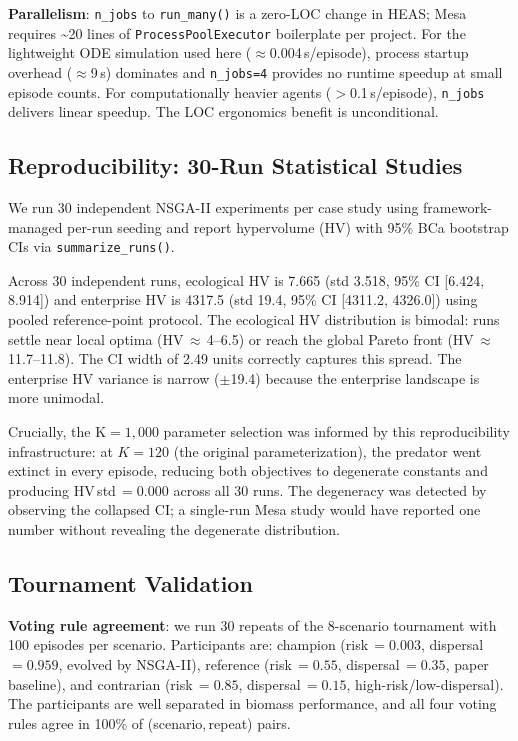 \documentclass{wscpaperproc}
\begin{document}
\textbf{Parallelism}: \texttt{n\_jobs} to \texttt{run\_many()} is a zero-LOC
change in HEAS; Mesa requires \textasciitilde{}20 lines of
\texttt{ProcessPoolExecutor} boilerplate per project. For the lightweight ODE
simulation used here ($\approx$0.004\,s/episode), process startup overhead
($\approx$9\,s) dominates and \texttt{n\_jobs=4} provides no runtime speedup at
small episode counts. For computationally heavier agents ($>$0.1\,s/episode),
\texttt{n\_jobs} delivers linear speedup. The LOC ergonomics benefit is
unconditional.

\subsection{Reproducibility: 30-Run Statistical Studies}

We run 30 independent NSGA-II experiments per case study using framework-managed
per-run seeding and report hypervolume (HV) with 95\% BCa bootstrap CIs via
\texttt{summarize\_runs()}.

Across 30 independent runs, ecological HV is 7.665 (std 3.518, 95\% CI
[6.424, 8.914]) and enterprise HV is 4317.5 (std 19.4, 95\% CI
[4311.2, 4326.0]) using pooled reference-point protocol.
The ecological HV distribution is bimodal: runs settle near local optima
(HV\,$\approx$\,4--6.5) or reach the global Pareto front
(HV\,$\approx$\,11.7--11.8). The CI width of 2.49 units correctly captures
this spread. The enterprise HV variance is narrow ($\pm$19.4) because the
enterprise landscape is more unimodal.

Crucially, the K$=1{,}000$ parameter selection was informed by this
reproducibility infrastructure: at $K=120$ (the original parameterization),
the predator went extinct in every episode, reducing both objectives to
degenerate constants and producing HV\,std\,$=0.000$ across all 30 runs. The
degeneracy was detected by observing the collapsed CI; a single-run Mesa study
would have reported one number without revealing the degenerate distribution.

\subsection{Tournament Validation}
\label{sec:tournament}

\textbf{Voting rule agreement}: we run 30 repeats of
the 8-scenario tournament with 100 episodes per scenario. Participants are:
champion (risk\,$=0.003$, dispersal\,$=0.959$, evolved by NSGA-II),
reference (risk\,$=0.55$, dispersal\,$=0.35$, paper baseline), and contrarian
(risk\,$=0.85$, dispersal\,$=0.15$, high-risk/low-dispersal). The participants
are well separated in biomass performance, and all four voting rules agree in 100\% of
(scenario,\,repeat) pairs.
\end{document}
